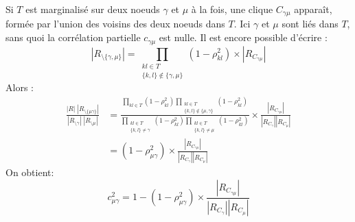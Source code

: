 \documentclass[11pt,a4paper]{article}
\begin{document}
Si $T$ est marginalisé sur deux noeuds $\gamma$ et $\mu$ à la fois, une clique $C_{\gamma \mu}$ apparaît, formée par l'union des voisins des deux noeuds dans $T$. Ici $\gamma$ et $\mu$ sont liés dans $T$, sans quoi la corrélation partielle $c_{\gamma \mu}$ est nulle. Il est encore possible d'écrire :
$$| R_{\setminus \{\gamma,\mu\}}| = \prod_{\substack{kl \in T \\ \{k,l\} \notin \{\gamma,\mu\}}} (1-\rho_{kl}^2) \times |R_{C_{\gamma\mu}}|$$
Alors :
\begin{align*}
    \frac{|R|\;|R_{\setminus \{\mu\gamma\}}|}{|R_{\setminus\gamma}|\;|R_{\setminus \mu}|} &= \frac{ \prod_{kl\in T} (1-\rho_{kl}^2)\prod_{\substack{kl\in T\\ \{k,l\} \notin \{\mu, \gamma\}}} (1-\rho_{kl}^2)}{\prod_{\substack{kl\in T \\\{k,l\} \neq \gamma }} (1-\rho_{kl}^2)\prod_{\substack{kl\in T \\ \{k,l\} \neq \mu }} (1-\rho_{kl}^2)} \times \frac{|R_{C_{\gamma \mu}}|}{|R_{C_\gamma}||R_{C_\mu}|}\\
     &=(1-\rho_{\mu\gamma}^2)\times \frac{|R_{C_{\gamma \mu}}|}{|R_{C_\gamma}||R_{C_\mu}|}
\end{align*}
 On obtient:
 $$  c_{\mu\gamma}^2 = 1-(1-\rho_{\mu\gamma}^2)\times \frac{|R_{C_{\gamma \mu}}|}{|R_{C_\gamma}||R_{C_\mu}|} $$
\end{document}
